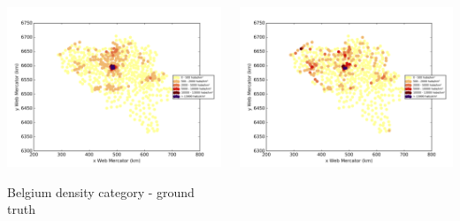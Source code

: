 \documentclass[c]{beamer}
\begin{document}
\begin{frame}
\begin{columns}
 \begin{column}{0.5\textwidth}
  \begin{overlayarea}{\linewidth}{4cm}
    \centering\vfill
    \includegraphics[scale=0.50]{images/Belgium/density_ground_truth.png}
  \end{overlayarea}
  \begin{overlayarea}{\linewidth}{0.5cm}
    \centering
    \tiny Belgium density category - ground truth\par
  \end{overlayarea}
 \end{column}
 \begin{column}{0.5\textwidth}
  \begin{overlayarea}{\linewidth}{4cm}
    \centering\vfill
    \includegraphics[scale=0.50]{images/Belgium/knn/density_classification.png}

\end{overlayarea}
\end{column}
\end{columns}
\end{frame}
\end{document}
